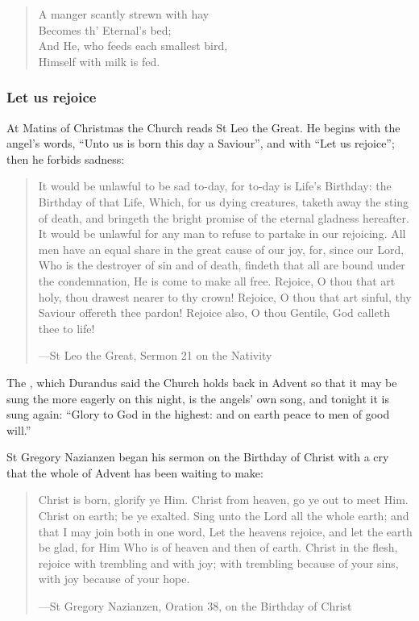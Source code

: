 \begin{verse}
A manger scantly strewn with hay \\
Becomes th' Eternal's bed; \\
And He, who feeds each smallest bird, \\
Himself with milk is fed.
\end{verse}

\subsubsection*{Let us rejoice}

At Matins of Christmas the Church reads St Leo the Great. He begins with the
angel's words, ``Unto us is born this day a Saviour'', and with ``Let us
rejoice''; then he forbids sadness:

\begin{quote}
It would be unlawful to be sad to-day, for to-day is Life's Birthday: the
Birthday of that Life, Which, for us dying creatures, taketh away the sting of
death, and bringeth the bright promise of the eternal gladness hereafter. It
would be unlawful for any man to refuse to partake in our rejoicing. All men
have an equal share in the great cause of our joy, for, since our Lord, Who is
the destroyer of sin and of death, findeth that all are bound under the
condemnation, He is come to make all free. Rejoice, O thou that art holy, thou
drawest nearer to thy crown! Rejoice, O thou that art sinful, thy Saviour
offereth thee pardon! Rejoice also, O thou Gentile, God calleth thee to life!\par
{\smallskip\noindent\small ---St Leo the Great, Sermon 21 on the Nativity\par}
\end{quote}

The , which Durandus said the Church holds back in
Advent so that it may be sung the more eagerly on this night, is the angels' own
song, and tonight it is sung again: ``Glory to God in the highest: and on earth
peace to men of good will.''

St Gregory Nazianzen began his sermon on the Birthday of Christ with a cry
that the whole of Advent has been waiting to make:

\begin{quote}
Christ is born, glorify ye Him. Christ from heaven, go ye out to meet Him.
Christ on earth; be ye exalted. Sing unto the Lord all the whole earth; and
that I may join both in one word, Let the heavens rejoice, and let the earth be
glad, for Him Who is of heaven and then of earth. Christ in the flesh, rejoice
with trembling and with joy; with trembling because of your sins, with joy
because of your hope.\par
{\smallskip\noindent\small ---St Gregory Nazianzen, Oration 38, on the Birthday of Christ\par}
\end{quote}

